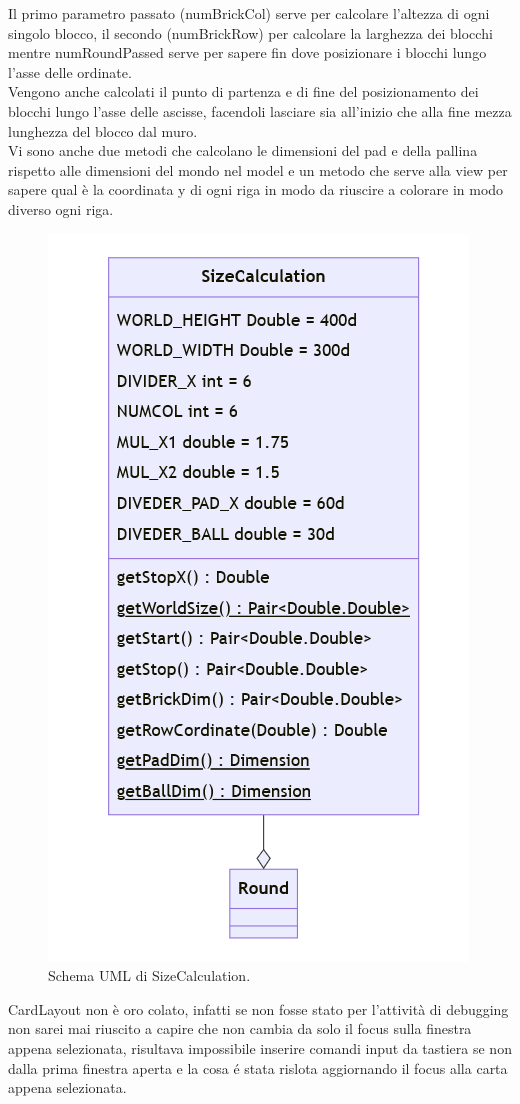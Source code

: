 \documentclass[a4paper,12pt]{report}
\begin{document}
Il primo parametro passato (numBrickCol) serve per calcolare l'altezza di ogni singolo blocco, il secondo (numBrickRow) per calcolare la larghezza dei blocchi
mentre numRoundPassed serve per sapere fin dove posizionare i blocchi lungo l'asse delle ordinate.
\\Vengono anche calcolati il punto di partenza e di fine del posizionamento dei blocchi lungo l'asse delle ascisse, facendoli lasciare sia all'inizio che alla fine mezza
lunghezza del blocco dal muro.
\\Vi sono anche due metodi che calcolano le dimensioni del pad e della pallina rispetto alle dimensioni del mondo nel model e un metodo che serve alla view per sapere qual è
la coordinata y di ogni riga in modo da riuscire a colorare in modo diverso ogni riga.
\begin{figure}[H]
    \centering{}
    \includegraphics[scale=0.5]{images/SizeCalculation.png}
    \caption{Schema UML di SizeCalculation.}
    \label{images:SizeCalculation}
\end{figure}CardLayout non è oro colato, infatti se non fosse stato per l'attività di debugging non sarei mai riuscito
a capire che non cambia da solo il focus sulla finestra appena selezionata, risultava impossibile
inserire comandi input da tastiera se non dalla prima finestra aperta e la cosa é stata rislota
aggiornando il focus alla carta appena selezionata.
\\
\end{document}
